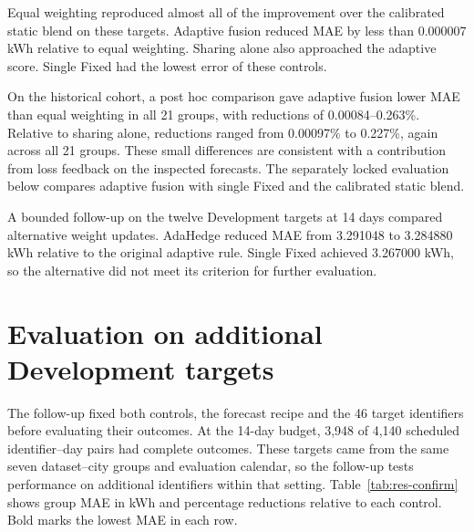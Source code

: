 Equal weighting reproduced almost all of the improvement over the calibrated static blend on these targets. Adaptive fusion reduced MAE by less than 0.000007 kWh relative to equal weighting. Sharing alone also approached the adaptive score. Single Fixed had the lowest error of these controls.

On the historical cohort, a post hoc comparison gave adaptive fusion lower MAE than equal weighting in all 21 groups, with reductions of 0.00084--0.263\%. Relative to sharing alone, reductions ranged from 0.00097\% to 0.227\%, again across all 21 groups. These small differences are consistent with a contribution from loss feedback on the inspected forecasts. The separately locked evaluation below compares adaptive fusion with single Fixed and the calibrated static blend.

A bounded follow-up on the twelve Development targets at 14 days compared alternative weight updates. AdaHedge \cite{rooij2014} reduced MAE from 3.291048 to 3.284880 kWh relative to the original adaptive rule. Single Fixed achieved 3.267000 kWh, so the alternative did not meet its criterion for further evaluation.

\section{Evaluation on additional Development targets}
The follow-up fixed both controls, the forecast recipe and the 46 target identifiers before evaluating their outcomes. At the 14-day budget, 3,948 of 4,140 scheduled identifier--day pairs had complete outcomes. These targets came from the same seven dataset--city groups and evaluation calendar, so the follow-up tests performance on additional identifiers within that setting. Table~\ref{tab:res-confirm} shows group MAE in kWh and percentage reductions relative to each control. Bold marks the lowest MAE in each row.

\begin{table}[H]\centering\small
\caption{Forecast errors on the 46 additional Development identifiers.}\label{tab:res-confirm}
\end{table}

